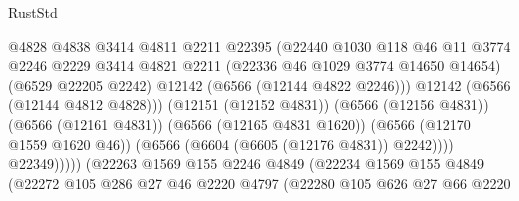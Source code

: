 \begin{lexlean}{RustStd}
\begin{coremodule}
                                            @4828
                                            @4838
                                            @3414
                                            @4811
                                            @2211
                                            @22395
                                            (@22440
                                              @1030
                                              @118
                                              @46
                                              @11
                                              @3774
                                              @2246
                                              @2229
                                              @3414
                                              @4821
                                              @2211
                                              (@22336 @46 @1029 @3774 @14650 @14654)
                                              (@6529 @22205 @2242)
                                              @12142
                                              (@6566 (@12144 @4822 @2246)))
                                            @12142
                                            (@6566 (@12144 @4812 @4828)))
                                          (@12151 (@12152 @4831))
                                          (@6566 (@12156 @4831))
                                          (@6566 (@12161 @4831))
                                          (@6566 (@12165 @4831 @1620))
                                          (@6566 (@12170 @1559 @1620 @46))
                                          (@6566 (@6604 (@6605 (@12176 @4831)) @2242))))
                                      @22349)))))
                            (@22263
                              @1569
                              @155
                              @2246
                              @4849
                              (@22234
                                @1569
                                @155
                                @4849
                                (@22272
                                  @105
                                  @286
                                  @27
                                  @46
                                  @2220
                                  @4797
                                  (@22280
                                    @105
                                    @626
                                    @27
                                    @66
                                    @2220

\end{coremodule}
\end{lexlean}
